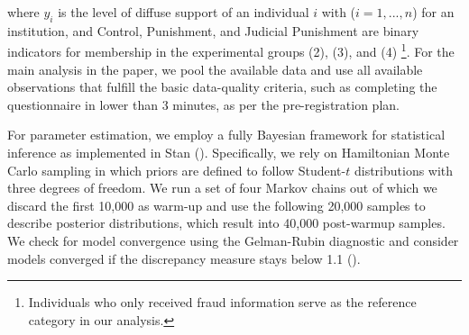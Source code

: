 \documentclass[11pt, ngerman,english,a4]{article}
\begin{document}
\noindent where $y_i$ is the level of diffuse support of an individual $i$ with ($i=1,...,n$) for an institution, and Control, Punishment, and Judicial Punishment are binary indicators for membership in the experimental groups (2),  (3), and (4) \footnote{Individuals who only received fraud information serve as the reference category in our analysis.}. For the main analysis in the paper, we pool the available data and use all available observations that fulfill the basic data-quality criteria, such as completing the questionnaire in lower than 3 minutes, as per the pre-registration plan. 

For parameter estimation, we employ a fully Bayesian framework for statistical inference as implemented in Stan (\citealt{StanDevelopmentTeam2020}). 
Specifically, we rely on Hamiltonian Monte Carlo sampling in which priors are defined to follow Student-$t$ distributions with three degrees of freedom.
We run a set of four Markov chains out of which we discard the first 10,000 as warm-up and use the following 20,000 samples to describe posterior distributions, which result into 40,000 post-warmup samples. We check for model convergence using the Gelman-Rubin diagnostic and consider models converged if the discrepancy measure stays below 1.1 (\citealt{Gelman2004}).



\end{document}
